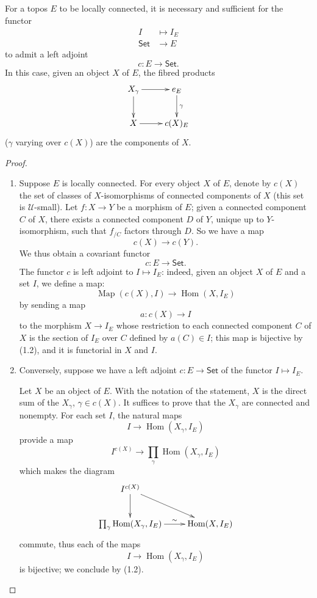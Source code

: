 \documentclass[10pt]{amsart}
\newcommand{\cal}{\mathcal}
\newcommand{\cat}{\mathsf}
\DeclareMathOperator{\Hom}{Hom}
\DeclareMathOperator{\Map}{Map}
\begin{document}
\subsection{}
For a topos $E$ to be locally connected, it is necessary and sufficient for the functor
\begin{align*}
  I & \longmapsto I_E\\
  \cat{Set} & \longrightarrow E
\end{align*}
to admit a left adjoint
\[
  c:E\longrightarrow\cat{Set}.
\]
In this case, given an object $X$ of $E$, the fibred products
\[
  \xymatrix{
    X_\gamma\ar[r]\ar[d] & e_E\ar[d]^\gamma\\
    X\ar[r] & c(X)_E
  }
\]
($\gamma$ varying over $c(X)$) are the components of $X$.

\begin{proof}
\medskip\noindent
\begin{enumerate}[label=(\roman*)]
  \item Suppose $E$ is locally connected.
    For every object $X$ of $E$, denote by $c(X)$ the set of classes of $X$-isomorphisms of connected components of $X$ (this set is $\cal{U}$-small).
    Let $f:X\to Y$ be a morphism of $E$;
    given a connected component $C$ of $X$, there exists a connected component $D$ of $Y$, unique up to $Y$-isomorphism, such that $f_{/C}$ factors through $D$.
    So we have a map
    \[
      c(X)\longrightarrow c(Y).
    \]
    We thus obtain a covariant functor
    \[
      c:E\longrightarrow\cat{Set}.
    \]
    The functor $c$ is left adjoint to $I\mapsto I_E$: indeed, given an object $X$ of $E$ and a set $I$, we define a map:
    \[
      \Map(c(X),I)\longrightarrow\Hom(X,I_E)
    \]
    by sending a map
    \[
      a:c(X)\longrightarrow I
    \]
    to the morphism $X\to I_E$ whose restriction to each connected component $C$ of $X$ is the section of $I_E$ over $C$ defined by $a(C)\in I$;
    this map is bijective by (1.2), and it is functorial in $X$ and $I$.
  \item Conversely, suppose we have a left adjoint $c:E\to\cat{Set}$ of the functor $I\mapsto I_E$.

    Let $X$ be an object of $E$.
    With the notation of the statement, $X$ is the direct sum of the $X_\gamma$, $\gamma\in c(X)$.
    It suffices to prove that the $X_\gamma$ are connected and nonempty.
    For each set $I$, the natural maps
    \[
      I\longrightarrow\Hom(X_\gamma,I_E)
    \]
    provide a map
    \[
      I^{c(X)}\longrightarrow\prod_\gamma\Hom(X_\gamma,I_E)
    \]
    which makes the diagram
    \[
      \xymatrix{
        I^{c(X)}\ar[rd]\ar[d]\\
        \prod_\gamma\Hom(X_\gamma,I_E)\ar[r]^-\sim & \Hom(X,I_E)
      }
    \]
    commute, thus each of the maps
    \[ 
      I\longrightarrow\Hom(X_\gamma,I_E)
    \]
    is bijective;
    we conclude by (1.2).
\end{enumerate}
\end{proof}
\end{document}
